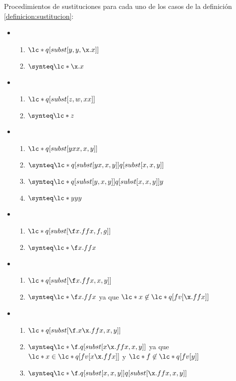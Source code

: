 \begin{ejemplo} Procedimientos de sustituciones para cada uno de los casos de la
  definición \ref{definicion:sustitucion}: \

  \begin{itemize}
  \item \begin{enumerate}
    \item \(\lc*{q[subst[y,y,\x.x]]}\)
    \item \(\synteq \lc*{\x.x}\)
    \end{enumerate}
  \item \begin{enumerate}
    \item \(\lc*{q[subst[z,w,x x]]}\)
    \item \(\synteq \lc*{z}\)
    \end{enumerate}
  \item \begin{enumerate}
    \item \(\lc*{q[subst[y x x, x, y]]}\)
    \item \(\synteq \lc*{q[subst[y x, x, y]] q[subst[x, x, y]]}\)
    \item \(\synteq \lc*{q[subst[y, x, y]] q[subst[x, x, y]] y}\)
    \item \(\synteq \lc*{y y y}\)
    \end{enumerate}
  \item \begin{enumerate}
    \item \(\lc*{q[subst[\f x.f f x, f, g]]}\)
    \item \(\synteq \lc*{\f x.f f x}\)
    \end{enumerate}
  \item \begin{enumerate}
    \item \(\lc*{q[subst[\f x.f f x, x, y]]}\)
    \item \(\synteq \lc*{\f x.f f x}\) ya que \(\lc*{x} \not\in \lc*{q[fv[\x.f f x]]}\)
    \end{enumerate}
  \item \begin{enumerate}
    \item \(\lc*{q[subst[\f.x\x.f f x, x, y]]}\)
    \item \(\synteq \lc*{\f.q[subst[x\x.f f x, x, y]]}\) ya que
      \(\lc*{x}\in\lc*{q[fv[x\x.f f x]]}\) y \(\lc*{f}\not\in \lc*{q[fv[y]]}\)
    \item \(\synteq \lc*{\f.q[subst[x,x,y]] q[subst[\x.f f x, x, y]]}\)

\end{enumerate}
\end{itemize}
\end{ejemplo}
